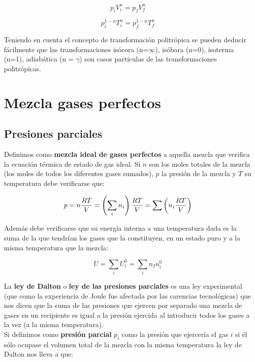 \documentclass[12pt]{book}
\begin{document}
\begin{equation}
p_i V_i^{n} = p_f V_f^{n}
\end{equation}


\begin{equation}
p_i^{1-n} T_i^{n} = p_f^{1-n} T_f^{n} 
\end{equation}

Teniendo en cuenta el concepto de transformación politrópica se pueden deducir fácilmente que las transformaciones isócora (n=$\infty$), isóbara (n=0), isoterma (n=1), adiabática (n = $\gamma$) son casos particulas de las transformaciones politrópicas.


\section{Mezcla gases perfectos}

\subsection{Presiones parciales}

Definimos como \textbf{mezcla ideal de gases perfectos} a aquella mezcla que verifica la ecuación térmica de estado de gas ideal. Si $n$ son los moles totales de la mezcla (los moles de todos los diferentes gases sumados), $p$ la presión de la mezcla y $T$ su temperatura debe verificarse que:

\begin{equation}
p = n \dfrac{RT}{V} = \left( \sum_i n_i \right) \dfrac{RT}{V} = \sum \left(  n_i \dfrac{RT}{V} \right)
\end{equation}

Además debe verificarse que su energía interna a una temperatura dada es la suma de la que tendrían los gases que la constituyen, en un estado puro y a la misma temperatura que la mezcla:

\begin{equation}
U = \sum_i U_i^0 = \sum_i n_I u_i^0
\end{equation}

La \textbf{ley de Dalton} o \textbf{ley de las presiones parciales} es una ley experimental (que como la experiencia de Joule fue afectada por las carencias tecnológicas) que nos dicen que la suma de las presiones que ejercen por separado una mezcla de gases en un recipiente es igual a la presión ejercida al introducir todos los gases a la vez (a la misma temperatura). \\

Si definimos como \textbf{presión parcial} $p_i$ como la presión que ejercería el gas $i$ si él sólo ocupase el volumen total de la mezcla con la misma temperatura la ley de Dalton nos lleva a que:
\end{document}
